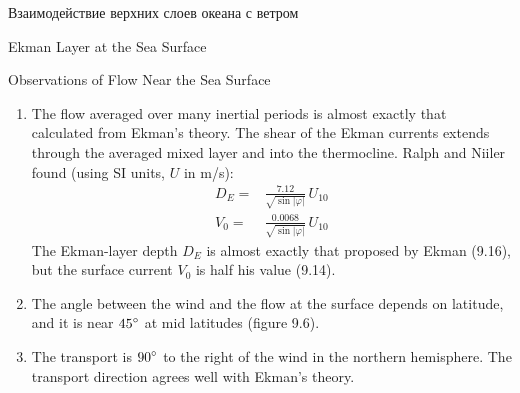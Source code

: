 \begin{chapter}{Взаимодействие верхних слоев океана с ветром}
\begin{section}{Ekman Layer at the Sea Surface}
\begin{paragraph}{Observations of Flow Near the Sea Surface}
\begin{enumerate}
\item 
The flow averaged over many inertial periods is almost exactly
that calculated from Ekman's theory. The shear of the Ekman currents
extends through the averaged mixed layer and into the thermocline. Ralph and Niiler found (using SI
units, $U$ in m/s):
\begin{align}
 D_E =& \frac{7.12}{\sqrt{\sin|\varphi|}}\, U_{10}\\
 V_0 =& \frac{0.0068}{\sqrt{\sin|\varphi|}}\, U_{10}
\end{align}
The Ekman-layer depth $D_E$ is almost exactly that proposed by Ekman
(9.16), but the surface current $V_0$ is half his value (9.14).
%

\item 
The angle between the wind and the flow at the surface depends
on latitude, and it is near ${45}^\circ$ at mid latitudes (figure 9.6).
%

\item 
The transport is ${90}^\circ$ to the right
of the wind in the northern hemisphere. The
transport direction agrees well with Ekman's theory.
%
\end{enumerate}


\end{paragraph}
\end{section}
\end{chapter}
